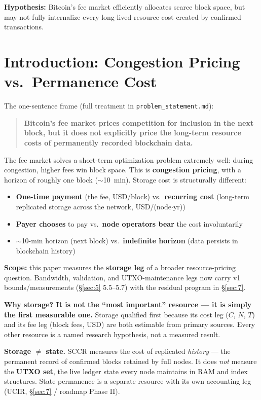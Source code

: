 \documentclass[11pt]{article}
\begin{document}
\noindent\textbf{Hypothesis:} Bitcoin's fee market efficiently allocates scarce block space, but may not fully internalize every long-lived resource cost created by confirmed transactions.

\section{Introduction: Congestion Pricing vs.\ Permanence Cost}\label{sec:1}
The one-sentence frame (full treatment in \texttt{problem\_statement.md}):
\begin{quote}
\textbf{Bitcoin's fee market prices competition for inclusion in the next block, but it does not explicitly price the long-term resource costs of permanently recorded blockchain data.}
\end{quote}
The fee market solves a short-term optimization problem extremely well: during congestion, higher fees win block space. This is \textbf{congestion pricing}, with a horizon of roughly one block ($\sim$10~min). Storage cost is structurally different:
\begin{itemize}[nosep]
  \item \textbf{One-time payment} (the fee, USD/block) vs.\ \textbf{recurring cost} (long-term replicated storage across the network, USD/(node$\cdot$yr))
  \item \textbf{Payer chooses} to pay vs.\ \textbf{node operators bear} the cost involuntarily
  \item $\sim$10-min horizon (next block) vs.\ \textbf{indefinite horizon} (data persists in blockchain history)
\end{itemize}
\textbf{Scope:} this paper measures the \textbf{storage leg} of a broader resource-pricing question. Bandwidth, validation, and UTXO-maintenance legs now carry v1 bounds/measurements (\S\ref{sec:5} 5.5--5.7) with the residual program in \S\ref{sec:7}.

\textbf{Why storage? It is not the ``most important'' resource --- it is simply the first measurable one.} Storage qualified first because its cost leg ($C$, $N$, $T$) and its fee leg (block fees, USD) are both estimable from primary sources. Every other resource is a named research hypothesis, not a measured result.

\textbf{Storage $\neq$ state.} SCCR measures the cost of replicated \emph{history} --- the permanent record of confirmed blocks retained by full nodes. It does \emph{not} measure the \textbf{UTXO set}, the live ledger state every node maintains in RAM and index structures. State permanence is a separate resource with its own accounting leg (UCIR, \S\ref{sec:7} / roadmap Phase II).
\end{document}
